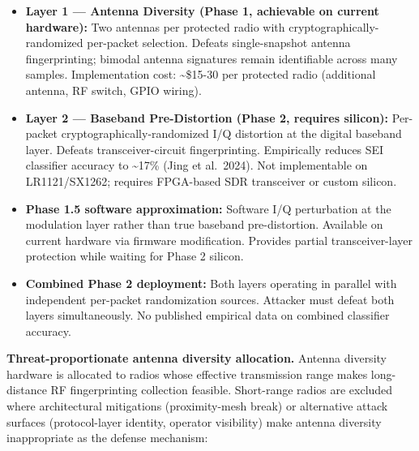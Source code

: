 \documentclass[
  11pt,
]{article}
\providecommand{\tightlist}{%
  \setlength{\itemsep}{0pt}\setlength{\parskip}{0pt}}
\begin{document}
\begin{itemize}
\tightlist
\item
  \textbf{Layer 1 --- Antenna Diversity (Phase 1, achievable on current
  hardware):} Two antennas per protected radio with
  cryptographically-randomized per-packet selection. Defeats
  single-snapshot antenna fingerprinting; bimodal antenna signatures
  remain identifiable across many samples. Implementation cost:
  \textasciitilde\$15-30 per protected radio (additional antenna, RF
  switch, GPIO wiring).
\item
  \textbf{Layer 2 --- Baseband Pre-Distortion (Phase 2, requires
  silicon):} Per-packet cryptographically-randomized I/Q distortion at
  the digital baseband layer. Defeats transceiver-circuit
  fingerprinting. Empirically reduces SEI classifier accuracy to
  \textasciitilde17\% (Jing et al.~2024). Not implementable on
  LR1121/SX1262; requires FPGA-based SDR transceiver or custom silicon.
\item
  \textbf{Phase 1.5 software approximation:} Software I/Q perturbation
  at the modulation layer rather than true baseband pre-distortion.
  Available on current hardware via firmware modification. Provides
  partial transceiver-layer protection while waiting for Phase 2
  silicon.
\item
  \textbf{Combined Phase 2 deployment:} Both layers operating in
  parallel with independent per-packet randomization sources. Attacker
  must defeat both layers simultaneously. No published empirical data on
  combined classifier accuracy.
\end{itemize}

\textbf{Threat-proportionate antenna diversity allocation.} Antenna
diversity hardware is allocated to radios whose effective transmission
range makes long-distance RF fingerprinting collection feasible.
Short-range radios are excluded where architectural mitigations
(proximity-mesh break) or alternative attack surfaces (protocol-layer
identity, operator visibility) make antenna diversity inappropriate as
the defense mechanism:
\end{document}
